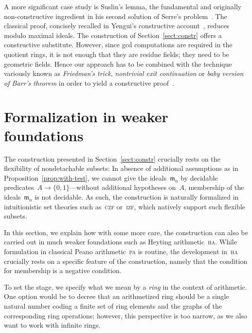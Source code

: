 \documentclass[com,11pt,crcready]{iosart2x}
\theoremstyle{definition}
\theoremstyle{plain}
\theoremstyle{remark}
\newcommand{\mmm}{\mathfrak{m}}
\renewcommand{\_}{\mathpunct{.}\,}
\begin{document}
A more significant case study is Suslin's lemma, the fundamental and originally
non-constructive ingredient in his second solution of Serre's
problem~\cite{suslin:structure}. The classical proof, concisely recalled in
Yengui's constructive account~\cite{yengui:maximal}, reduces modulo
maximal ideals. The construction of Section~\ref{sect:constr} offers a
constructive substitute. However, since gcd computations
are required in the quotient rings, it is not enough that they are residue
fields; they need to be geometric fields. Hence our approach has to be combined
with the technique variously known as \emph{Friedman's trick}, \emph{nontrivial
exit continuation} or \emph{baby version of Barr's theorem} in order to yield a
constructive
proof~\cite{friedman:trick,murthy:classical-proofs,barr:without-points,blechschmidt:generalized-spaces}.


\section{Formalization in weaker foundations}
\label{sect:arithmetization}

The construction presented in Section~\ref{sect:constr} crucially rests on the
flexibility of nondetachable subsets: In absence of additional
assumptions as in Proposition~\ref{prop:with-test},
we cannot give the ideals~$\mmm_n$ by decidable
predicates~$A \to \{0,1\}$---without additional hypotheses on~$A$, membership of the
ideals~$\mmm_n$ is not decidable. As such, the construction is
naturally formalized in intuitionistic set theories such as~\textsc{czf}
or~\textsc{izf}, which natively support such flexible subsets.

In this section, we explain how with some more care, the construction can also
be carried out in much weaker foundations such as Heyting
arithmetic~\textsc{ha}. While formulation in classical Peano arithmetic~\textsc{pa}
is routine, the development in~\textsc{ha} crucially rests on a specific
feature of the construction, namely that the condition for membership is a
negative condition.

To set the stage, we specify what we mean by a \emph{ring} in the context of
arithmetic. One option would be to decree that an arithmetized ring should be a single
natural number coding a finite set of ring elements and the graphs of the
corresponding ring operations; however, this perspective is too narrow, as we
also want to work with infinite rings.
\end{document}
